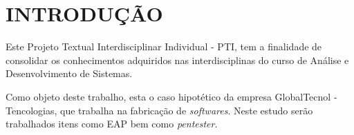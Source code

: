 
\chapter{INTRODUÇÃO}
\label{chap:introducao}

Este Projeto Textual Interdisciplinar Individual - PTI, tem a finalidade de consolidar os conhecimentos adquiridos nas interdisciplinas do curso de Análise e Desenvolvimento de Sistemas.

Como objeto deste trabalho, esta o caso hipotético da empresa GlobalTecnol - Tencologias, que trabalha na fabricação de \textit{softwares}.  Neste estudo serão trabalhados itens como EAP bem como \textit{pentester}.
